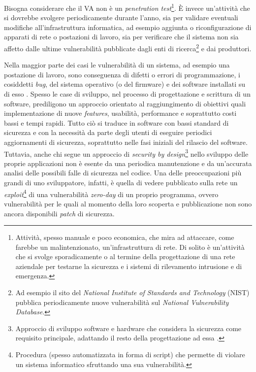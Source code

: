 \documentclass[target=bach,aauheader=]{thud}
\begin{document}
Bisogna considerare che il VA non è un \textit{penetration test}\footnote{Attività, spesso manuale e poco economica, che mira ad attaccare, come farebbe un malintenzionato, un’infrastruttura di rete. Di solito è un’attività che si svolge sporadicamente o al termine della progettazione di una rete aziendale per testarne la sicurezza e i sistemi di rilevamento intrusione e di emergenza.}. È invece un’attività che si dovrebbe svolgere periodicamente durante l’anno, sia per validare eventuali modifiche all’infrastruttura informatica, ad esempio aggiunta o riconfigurazione di apparati di rete o postazioni di lavoro, sia per verificare che il sistema non sia affetto dalle ultime vulnerabilità pubblicate dagli enti di ricerca\footnote{Ad esempio il sito del \textit{National Institute of Standards and Technology} (NIST) pubblica periodicamente nuove vulnerabilità sul \textit{National Vulnerability Database}.} e dai produttori.

Nella maggior parte dei casi le vulnerabilità di un sistema, ad esempio una postazione di lavoro, sono conseguenza di difetti o errori di programmazione, i cosiddetti \textit{bug}, del sistema operativo (o del firmware) e dei software installati su di esso \cite{bugs}. Spesso le case di sviluppo, nel processo di progettazione e scrittura di un software, prediligono un approccio orientato al raggiungimento di obiettivi quali implementazione di nuove \textit{features}, usabilità, performance e soprattutto costi bassi e tempi rapidi. Tutto ciò si traduce in software con bassi standard di sicurezza e con la necessità da parte degli utenti di eseguire periodici aggiornamenti di sicurezza, soprattutto nelle fasi iniziali del rilascio del software. Tuttavia, anche chi segue un approccio di \textit{security by design}\footnote{Approccio di sviluppo software e hardware che considera la sicurezza come requisito principale, adattando il resto della progettazione ad essa \cite{design}.} nello sviluppo delle proprie applicazioni non è esente da una periodica manutenzione e da un’accurata analisi delle possibili falle di sicurezza nel codice. Una delle preoccupazioni più grandi di uno sviluppatore, infatti, è quella di vedere pubblicato sulla rete un \textit{exploit}\footnote{Procedura (spesso automatizzata in forma di script) che permette di violare un sistema informatico sfruttando una sua vulnerabilità.} di una vulnerabilità \textit{zero-day} di un proprio programma, ovvero vulnerabilità per le quali al momento della loro scoperta e pubblicazione non sono ancora disponibili \textit{patch} di sicurezza.
\end{document}
